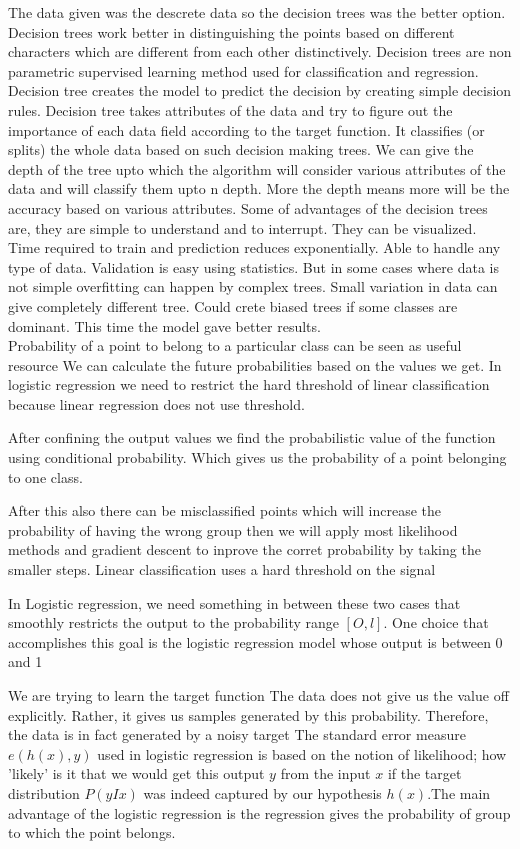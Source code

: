 \documentclass[conference,compsoc]{IEEEtran}
\begin{document}
The data given was the descrete data so the decision trees was the better option.
Decision trees work better in distinguishing the points based on different characters 
which are different from each other distinctively. 
Decision trees are non parametric
supervised learning method used for
classification and regression. Decision tree
creates the model to predict the decision by
creating simple decision rules.
Decision tree takes attributes of the data
and try to figure out the importance of each data
field according to the target function. It classifies (or splits) the whole data based on
such decision making trees. We can give the
depth of the tree upto which the algorithm will
consider various attributes of the data and will
classify them upto n depth. More the depth
means more will be the accuracy based on
various attributes.
Some of advantages of the decision trees
are, they are simple to understand and to
interrupt. They can be visualized. Time required
to train and prediction reduces exponentially.
Able to handle any type of data. Validation is
easy using statistics.
But in some cases where data is not
simple overfitting can happen by complex trees.
Small variation in data can give completely
different tree. Could crete biased trees if some
classes are dominant. This time the model gave better results. \\

Probability of a point to belong to a particular class can be seen as useful resource
We can calculate the future probabilities based on the values we get. 
In logistic regression we need to restrict
the hard threshold of linear classification
because linear regression does not use threshold.

After confining the output values we
find the probabilistic value of the function using
conditional probability. Which gives us the
probability of a point belonging to one class.

After this also there can be misclassified
points which will increase the probability of
having the wrong group then we will apply most
likelihood methods and gradient descent to
inprove the corret probability by taking the
smaller steps.
Linear classification uses a hard
threshold on the signal 

In Logistic regression, we need something in
between these two cases that smoothly
restricts the output to the probability range
$[O, l]$.
One choice that accomplishes this goal is
the logistic regression model
 whose output is between 0 and 1
 
We are trying to learn the target function
The data does not give us the value off
explicitly. Rather, it gives us samples
generated by this probability. Therefore, the data
is in fact generated by a noisy target
The standard error measure $e(h(x), y)$ used in
logistic regression is based on the notion of
likelihood; how 'likely' is it that we would get
this output $y$ from the input $x$ if the target
distribution $P(y I x)$ was indeed
captured by our hypothesis $h(x)$.The main advantage of the logistic regression is the regression gives the probability of group to which the point belongs.\\
\end{document}
